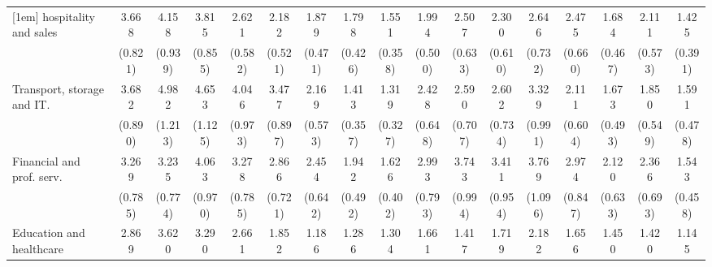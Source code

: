 {\begin{tabular}{l*{16}{c}}
[1em]
hospitality and sales&       3.668\sym{***}&       4.158\sym{***}&       3.815\sym{***}&       2.621\sym{***}&       2.182\sym{**} &       1.879\sym{*}  &       1.798\sym{*}  &       1.551         &       1.994\sym{**} &       2.507\sym{***}&       2.300\sym{**} &       2.646\sym{***}&       2.475\sym{***}&       1.684         &       2.111\sym{**} &       1.425         \\
                    &     (0.821)         &     (0.939)         &     (0.855)         &     (0.582)         &     (0.521)         &     (0.471)         &     (0.426)         &     (0.358)         &     (0.500)         &     (0.633)         &     (0.610)         &     (0.732)         &     (0.660)         &     (0.467)         &     (0.573)         &     (0.391)         \\
[1em]
Transport, storage and IT.&       3.682\sym{***}&       4.982\sym{***}&       4.653\sym{***}&       4.046\sym{***}&       3.477\sym{***}&       2.169\sym{**} &       1.413         &       1.319         &       2.428\sym{***}&       2.590\sym{***}&       2.602\sym{***}&       3.329\sym{***}&       2.111\sym{**} &       1.673         &       1.850\sym{*}  &       1.591         \\
                    &     (0.890)         &     (1.213)         &     (1.125)         &     (0.973)         &     (0.897)         &     (0.573)         &     (0.357)         &     (0.327)         &     (0.648)         &     (0.707)         &     (0.734)         &     (0.991)         &     (0.604)         &     (0.493)         &     (0.549)         &     (0.478)         \\
[1em]
Financial and prof. serv.&       3.269\sym{***}&       3.235\sym{***}&       4.063\sym{***}&       3.278\sym{***}&       2.866\sym{***}&       2.454\sym{***}&       1.942\sym{**} &       1.626\sym{*}  &       2.993\sym{***}&       3.743\sym{***}&       3.411\sym{***}&       3.769\sym{***}&       2.974\sym{***}&       2.120\sym{*}  &       2.366\sym{**} &       1.543         \\
                    &     (0.785)         &     (0.774)         &     (0.970)         &     (0.785)         &     (0.721)         &     (0.642)         &     (0.492)         &     (0.402)         &     (0.793)         &     (0.994)         &     (0.954)         &     (1.096)         &     (0.847)         &     (0.633)         &     (0.693)         &     (0.458)         \\
[1em]
Education and healthcare&       2.869\sym{***}&       3.620\sym{***}&       3.290\sym{***}&       2.661\sym{***}&       1.852\sym{*}  &       1.186         &       1.286         &       1.304         &       1.661         &       1.417         &       1.719         &       2.182\sym{*}  &       1.656         &       1.450         &       1.420         &       1.145         \\

\end{tabular}}
